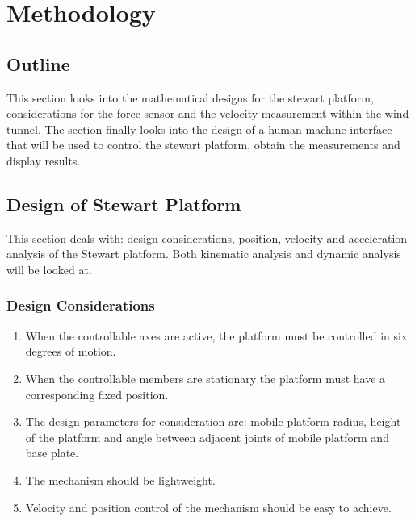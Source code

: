\section{Methodology}
\subsection{Outline}
This section looks into the mathematical designs for the stewart platform, considerations for the force sensor and the velocity measurement within the wind tunnel. The section finally looks into the design of a human machine interface that will be used to control the stewart platform,  obtain the measurements and display results.

\subsection{Design of Stewart Platform}
This section deals with: design considerations, position, velocity and acceleration analysis of the Stewart platform. Both kinematic analysis and dynamic analysis will be looked at.
\subsubsection{Design Considerations}
\begin{enumerate}
\item When the controllable axes are active, the platform must be controlled in six degrees of motion.
\item When the controllable members are stationary the
platform must have a corresponding fixed position.
\item The design parameters for consideration are: mobile platform radius, height of the platform and angle between adjacent joints of mobile platform and base plate.
\item The mechanism should be lightweight.
\item Velocity and position control of the mechanism should be easy to achieve.
\end{enumerate}
